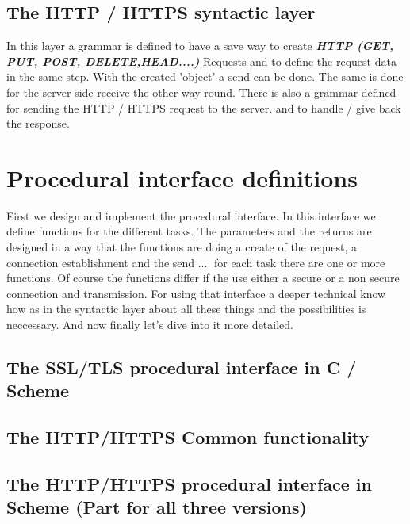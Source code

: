 \documentclass[10pt,a4paper,english]{article}
\newcommand{\abbrhighcol}[1]{\textbf{\textit{#1}}}
\begin{document}
\begin{multicols}{2}
\subsection{The HTTP / HTTPS  syntactic layer}
\begin{flushleft}
In this layer a grammar is defined to have a save way to create \abbrhighcol{ HTTP (GET, PUT, POST, DELETE,HEAD....)} Requests and to define the request data in the same step. With the created 'object' a send can be done. The same is done for the server side receive the other way round. There is also a grammar defined for sending the HTTP / HTTPS request to the server. and to handle / give back the response. 
\end{flushleft}


\section{Procedural interface definitions}
\begin{flushleft}
First we design and implement the procedural interface. In this interface we define functions for the different tasks. The parameters and the returns are designed in a way that  the functions are doing a create of the request, a connection establishment and the send .... for each task there  are  one or more functions. Of course the functions differ if the use either a secure or a non secure connection and transmission. For using that interface a deeper technical know how as in the syntactic layer about all these things and the possibilities is   neccessary.
And now finally let's dive into it more detailed.
\end{flushleft}
\subsection{The SSL/TLS procedural interface in C / Scheme}
\begin{flushleft}
\end{flushleft}
\subsection{The HTTP/HTTPS Common functionality}
\begin{flushleft}
\end{flushleft}
\subsection{The HTTP/HTTPS procedural interface in  Scheme (Part for all three versions)}
\begin{flushleft}
\end{flushleft}

\end{multicols}
\end{document}
